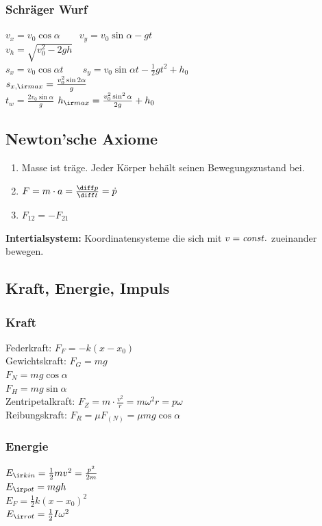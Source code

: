 \documentclass[german]{latex4ei/latex4ei_sheet}
\begin{document}
\subsubsection{Schräger Wurf}
$v_x=v_0\cos \alpha \qquad v_y=v_0\sin \alpha -gt$\\
$v_h=\sqrt{v_0^2-2gh}$\\
$s_x=v_0\cos \alpha t \qquad s_y=v_0 \sin \alpha t - \frac{1}{2} gt^2 +h_0$\\
$s_{x,\ir max}=\frac{v_0^2 \sin{2\alpha}}{g}$\\
$t_w=\frac{2v_0\sin \alpha}{g}$ \qquad
$h_{\ir max}=\frac{v_0^2 \sin^2 \alpha}{2g}+h_0$

\subsection{Newton'sche Axiome}
\begin{sectionbox}
\begin{enumerate}
	\item Masse ist träge. Jeder Körper behält seinen Bewegungszustand bei.
	\item $F=m\cdot a=\frac{\diff p}{\diff t}=\dot{p}$
	\item $F_{12}=-F_{21}$
\end{enumerate}
\end{sectionbox}
\textbf{Intertialsystem:} Koordinatensysteme die sich mit $v=\it const.$ zueinander bewegen.
\subsection{Kraft, Energie, Impuls}
\subsubsection{Kraft}
Federkraft: $F_F=-k(x-x_0)$ \\
Gewichtskraft: $F_G=mg$ \\
$F_N=mg\cos \alpha$ \\
$F_H=mg\sin \alpha$ \\
Zentripetalkraft: $F_Z=m\cdot \frac{v^2}{r}=m\omega^2r=p\omega$ \\
Reibungskraft: $F_R=\mu F_{(N)}=\mu m g \cos \alpha$
\subsubsection{Energie}
$E_{\ir kin}=\frac{1}{2}mv^2=\frac{p^2}{2m}$\\
$E_{\ir pot}=mgh$\\
$E_{F}=\frac{1}{2}k(x-x_0)^2$\\
$E_{\ir rot}=\frac{1}{2}I\omega^2$
\end{document}
